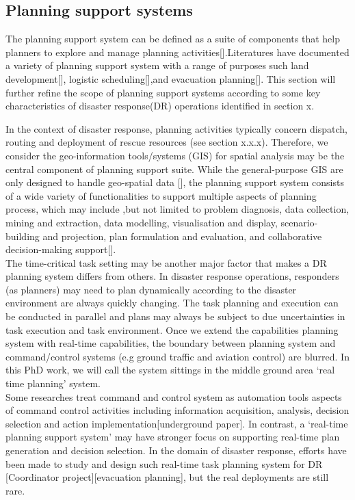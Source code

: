 \subsection{Planning support systems}
The planning support system can be defined as a suite of components that help planners to explore and manage planning activities[].Literatures have documented a variety of planning support system with a range of purposes such land development[], logistic scheduling[],and evacuation planning[]. This section will further refine the scope of planning support systems according to some key characteristics of disaster response(DR) operations identified in section x.

In the context of disaster response, planning activities  typically concern dispatch, routing and deployment of rescue resources (see section x.x.x). Therefore, we consider the geo-information tools/systems (GIS) for spatial analysis may be the central component of planning support suite. While the general-purpose GIS  are only designed to handle geo-spatial data [], the planning support system consists of a wide variety of functionalities to support multiple aspects of planning process, which may include  ,but not limited to problem diagnosis, data collection, mining and extraction, data modelling, visualisation and display, scenario-building and projection, plan formulation and evaluation, and collaborative decision-making support[]. \\

The time-critical task setting may be another major factor that makes a DR planning system differs from others. In disaster response operations, responders (as planners) may need to plan dynamically according to the disaster environment are always quickly changing. The task planning and execution can be conducted in parallel and plans may always be subject to due uncertainties in task execution and task environment. Once we extend the capabilities planning system with real-time capabilities, the boundary between planning system and command/control systems (e.g ground traffic and aviation control) are blurred. In this PhD work, we will call the system sittings in the middle ground area `real time planning' system.\\

Some researches treat command and control system as automation tools aspects of command control activities including information acquisition, analysis, decision selection and action implementation[underground paper].  In contrast, a `real-time planning support system' may have stronger focus on supporting real-time plan generation and decision selection. In the domain of disaster response, efforts have been made to study and design such real-time task planning system for DR [Coordinator project][evacuation planning], but the real deployments are still rare.\\

